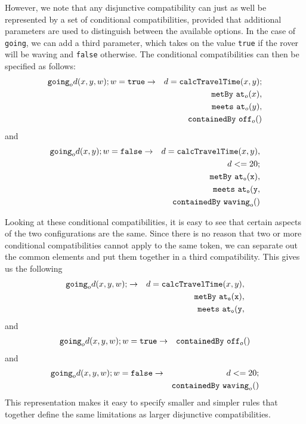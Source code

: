 However, we note that any disjunctive compatibility can just as well
be represented by a set of conditional compatibilities, provided that
additional parameters are used to distinguish between the available
options.  In the case of {\tt going}, we can add a third parameter,
which takes on the value {\tt true} if the rover will be waving and
{\tt false} otherwise.  The conditional compatibilities can then be
specified as follows:
  \begin{eqnarray*}
  {\tt going}_{o} d (x,y,w); w = {\tt true} 
 &  \rightarrow &
    d = {\tt calcTravelTime}(x,y); \\
  &&   {\tt metBy} \  {\tt at}_o(x), \\
  && {\tt meets} \  {\tt at}_o(y), \\
  && {\tt containedBy} \  {\tt off}_o() 
  \end{eqnarray*}
  and
  \begin{eqnarray*} 
  {\tt going}_{o} d (x,y);  w = {\tt false} & \rightarrow & 
  d = {\tt calcTravelTime}(x,y), \\
  && d <= 20 ;  \\ 
  && {\tt metBy} \  {\tt at_o(x)}, \\
  && {\tt meets} \  {\tt at_o(y}, \\
  && {\tt containedBy} \  {\tt waving}_o()
  \end{eqnarray*}

Looking at these conditional compatibilities, it is easy to see that
certain aspects of the two configurations are the same.  Since there
is no reason that two or more conditional compatibilities cannot apply
to the same token, we can separate out the common elements and put
them together in a third compatibility.  This gives us the following
  \begin{eqnarray*} 
  {\tt going}_{o} d (x,y,w); &\rightarrow &
   d = {\tt calcTravelTime}(x,y), \\
  && {\tt metBy} \  {\tt at_o(x)}, \\
  && {\tt meets} \  {\tt at_o(y}, 
  \end{eqnarray*}
  and 
   \begin{eqnarray*} 
  {\tt going}_{o} d (x,y,w); w = {\tt true}
  &\rightarrow &
   {\tt containedBy} \  {\tt off}_o()
  \end{eqnarray*}
  and
  \begin{eqnarray*} 
  {\tt going}_{o} d (x,y,w);  w = {\tt false}
  &\rightarrow & 
   d <= 20 ; \\
  && {\tt containedBy} \  {\tt waving}_o() 
  \end{eqnarray*}
  This representation makes it easy to specify smaller and simpler
rules that together define the same limitations as larger disjunctive
compatibilities.

